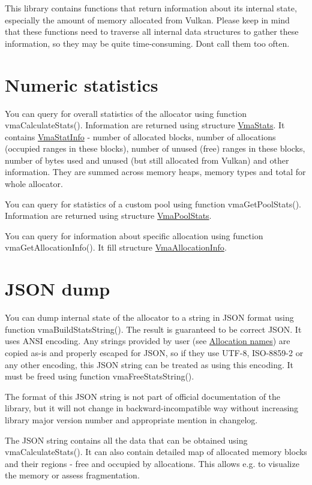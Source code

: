 This library contains functions that return information about its internal state, especially the amount of memory allocated from Vulkan. Please keep in mind that these functions need to traverse all internal data structures to gather these information, so they may be quite time-\/consuming. Don\textquotesingle{}t call them too often.\hypertarget{statistics_statistics_numeric_statistics}{}\section{Numeric statistics}\label{statistics_statistics_numeric_statistics}
You can query for overall statistics of the allocator using function vma\+Calculate\+Stats(). Information are returned using structure \hyperlink{structVmaStats}{Vma\+Stats}. It contains \hyperlink{structVmaStatInfo}{Vma\+Stat\+Info} -\/ number of allocated blocks, number of allocations (occupied ranges in these blocks), number of unused (free) ranges in these blocks, number of bytes used and unused (but still allocated from Vulkan) and other information. They are summed across memory heaps, memory types and total for whole allocator.

You can query for statistics of a custom pool using function vma\+Get\+Pool\+Stats(). Information are returned using structure \hyperlink{structVmaPoolStats}{Vma\+Pool\+Stats}.

You can query for information about specific allocation using function vma\+Get\+Allocation\+Info(). It fill structure \hyperlink{structVmaAllocationInfo}{Vma\+Allocation\+Info}.\hypertarget{statistics_statistics_json_dump}{}\section{J\+S\+O\+N dump}\label{statistics_statistics_json_dump}
You can dump internal state of the allocator to a string in J\+S\+ON format using function vma\+Build\+Stats\+String(). The result is guaranteed to be correct J\+S\+ON. It uses A\+N\+SI encoding. Any strings provided by user (see \hyperlink{allocation_annotation_allocation_names}{Allocation names}) are copied as-\/is and properly escaped for J\+S\+ON, so if they use U\+T\+F-\/8, I\+S\+O-\/8859-\/2 or any other encoding, this J\+S\+ON string can be treated as using this encoding. It must be freed using function vma\+Free\+Stats\+String().

The format of this J\+S\+ON string is not part of official documentation of the library, but it will not change in backward-\/incompatible way without increasing library major version number and appropriate mention in changelog.

The J\+S\+ON string contains all the data that can be obtained using vma\+Calculate\+Stats(). It can also contain detailed map of allocated memory blocks and their regions -\/ free and occupied by allocations. This allows e.\+g. to visualize the memory or assess fragmentation. 